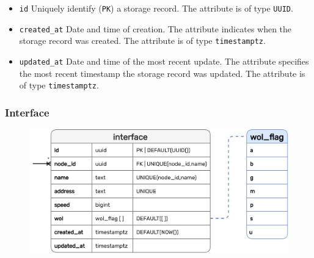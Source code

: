 \begin{itemize}
  \item \texttt{id}
    \newline
    Uniquely identify (\texttt{PK}) a storage record.
    \newline
    The attribute is of type \texttt{UUID}.

  \item \texttt{created\_at}
    \newline
    Date and time of creation.
    \newline
    The attribute indicates when the storage record was created.
    \newline
    The attribute is of type \texttt{timestamptz}.

  \item \texttt{updated\_at}
    \newline
    Date and time of the most recent update.
    \newline
    The attribute specifies the most recent timestamp the storage record was updated.
    \newline
    The attribute is of type \texttt{timestamptz}.
\end{itemize}

\subsubsection{Interface}
\label{subsubsec:implementation_server_database_interface}

\begin{figure}
  \centering
  \includegraphics[width=\linewidth]{images/implementation/erm_interface.png}
\end{figure}

